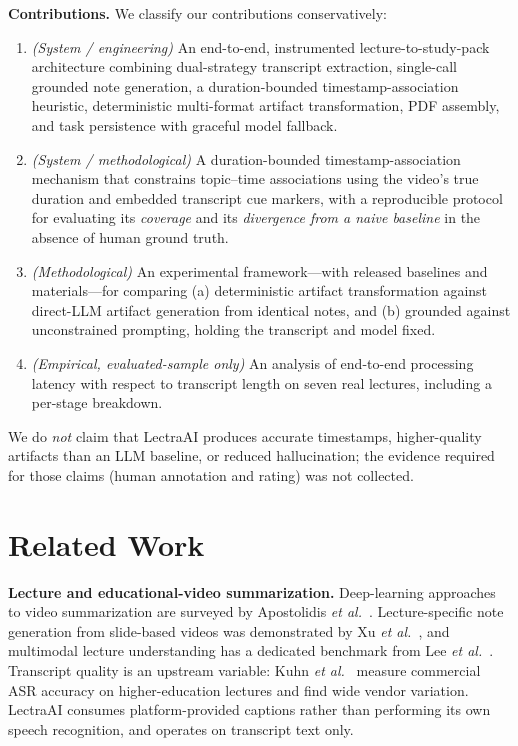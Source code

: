 \documentclass[conference]{IEEEtran}
\begin{document}
\noindent\textbf{Contributions.} We classify our contributions conservatively:
\begin{enumerate}
\item \emph{(System / engineering)} An end-to-end, instrumented lecture-to-study-pack architecture combining dual-strategy transcript extraction, single-call grounded note generation, a duration-bounded timestamp-association heuristic, deterministic multi-format artifact transformation, PDF assembly, and task persistence with graceful model fallback.
\item \emph{(System / methodological)} A duration-bounded timestamp-association mechanism that constrains topic--time associations using the video's true duration and embedded transcript cue markers, with a reproducible protocol for evaluating its \emph{coverage} and its \emph{divergence from a naive baseline} in the absence of human ground truth.
\item \emph{(Methodological)} An experimental framework---with released baselines and materials---for comparing (a) deterministic artifact transformation against direct-LLM artifact generation from identical notes, and (b) grounded against unconstrained prompting, holding the transcript and model fixed.
\item \emph{(Empirical, evaluated-sample only)} An analysis of end-to-end processing latency with respect to transcript length on seven real lectures, including a per-stage breakdown.
\end{enumerate}
We do \emph{not} claim that LectraAI produces accurate timestamps, higher-quality artifacts than an LLM baseline, or reduced hallucination; the evidence required for those claims (human annotation and rating) was not collected.

\section{Related Work}
\textbf{Lecture and educational-video summarization.} Deep-learning approaches to video summarization are surveyed by Apostolidis \emph{et al.}~\cite{apostolidis2021}. Lecture-specific note generation from slide-based videos was demonstrated by Xu \emph{et al.}~\cite{xu2019}, and multimodal lecture understanding has a dedicated benchmark from Lee \emph{et al.}~\cite{lee2023}. Transcript quality is an upstream variable: Kuhn \emph{et al.}~\cite{kuhn2023} measure commercial ASR accuracy on higher-education lectures and find wide vendor variation. LectraAI consumes platform-provided captions rather than performing its own speech recognition, and operates on transcript text only.
\end{document}
